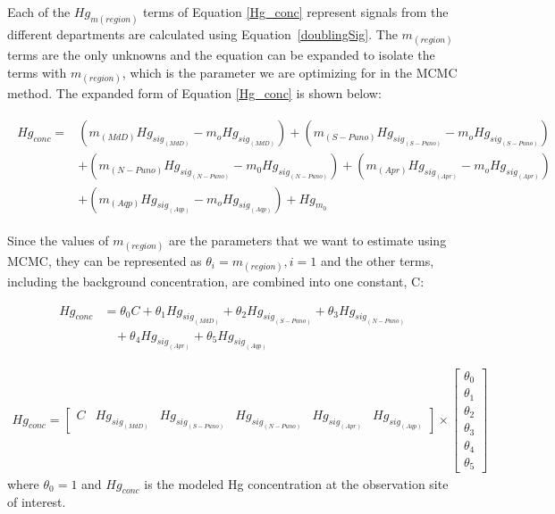 \begin{flushleft}
Each of the $Hg_{m(region)}$ terms of Equation \ref{Hg_conc} represent signals from the different departments are calculated using Equation~\ref{doublingSig}. The $m_(region)$ terms are the only unknowns and the equation can be expanded to isolate the terms with $m_(region)$, which is the parameter we are optimizing for in the MCMC method. The expanded form of Equation \ref{Hg_conc} is shown below:

\begin{align}
\begin{split}\label{Cs36PoGd2l}
Hg_{conc}={}& (m_{(MdD)}Hg_{sig_{(MdD)}} -m_oHg_{sig_{(MdD)}})+ (m_{(S-Puno)}Hg_{sig_{(S-Puno)}} -m_oHg_{sig_{(S-Puno)}}) \\
            &+ (m_{(N-Puno)}Hg_{sig_{(N-Puno)}} -m_0Hg_{sig_{(N-Puno)}}) + (m_{(Apr)}Hg_{sig_{(Apr)}} -m_oHg_{sig_{(Apr)}}) \\
            &+ (m_{(Aqp)}Hg_{sig_{(Aqp)}} -m_oHg_{sig_{(Aqp)}})+Hg_{m_0}
\end{split}
\end{align}

Since the values of $m_{(region)}$ are the parameters that we want to estimate using MCMC, they can be represented as $\theta_i=m_{(region)}, i=1$ and the other terms, including the background concentration, are combined into one constant, C:

\begin{equation}
\begin{aligned}
    Hg_{conc}  & = \theta_0C  + \theta_1Hg_{sig_{(MdD)}}+ \theta_2Hg_{sig_{(S-Puno)}} +  \theta_3Hg_{sig_{(N-Puno)}} \\
                & \ \ \ \  +\theta_4Hg_{sig_{(Apr)}} +  \theta_5Hg_{sig_{(Aqp)}}
\end{aligned}
\end{equation}

\begin{align}
Hg_{conc} =\begin{bmatrix} C & Hg_{sig_{(MdD)}} & Hg_{sig_{(S-Puno)}} &Hg_{sig_{(N-Puno)}} &Hg_{sig_{(Apr)}} &Hg_{sig_{(Aqp)}}\end{bmatrix} \times 
            \begin{bmatrix} \theta_0 \\ \theta_1 \\ \theta_2\\ \theta_3\\ \theta_4\\ \theta_5  \end{bmatrix}
\end{align}
where $\theta_0=1$ and $Hg_{conc}$ is the modeled Hg concentration at the observation site of interest.
\end{flushleft}

